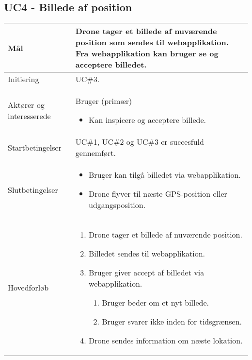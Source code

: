 \subsection*{UC4 - Billede af position}

\begin{table}[H]
\begin{tabular}{| p{3cm}| p{11.5cm}|}
\hline

Mål	 							& Drone tager et billede af nuværende position som sendes til webapplikation. Fra webapplikation kan bruger se og acceptere billedet. \\\hline
Initiering 							& UC\#3. \\\hline
Aktører og \newline interesserede			& Bruger (primær) 
										\begin{itemize}
											\item Kan inspicere og acceptere billede.
										\end{itemize} \\ \hline
										
Startbetingelser					& UC\#1, UC\#2 og UC\#3 er succesfuld gennemført. \\\hline
Slutbetingelser						& 	\begin{itemize}
											\item Bruger kan tilgå billedet via webapplikation.
											\item Drone flyver til næste GPS-position eller udgangsposition.
										\end{itemize} \\\hline
Hovedforløb				&
 
									\renewcommand{\labelenumi}{\arabic{enumi}.}
									\renewcommand{\labelenumii}{\Roman{enumii}:}

									\begin{enumerate}[topsep=0.0cm, leftmargin=0.5cm]
										\item Drone tager et billede af nuværende position.
										\item Billedet sendes til webapplikation.
										\item Bruger giver accept af billedet via webapplikation.
											\begin{enumerate}[partopsep=4cm, topsep=0cm, leftmargin=1cm]
												\item Bruger beder om et nyt billede.
												\item Bruger svarer ikke inden for tidsgrænsen.
											\end{enumerate}
										\item Drone sendes information om næste lokation.
									\end{enumerate} \\\hline	


\end{tabular}
\end{table}
